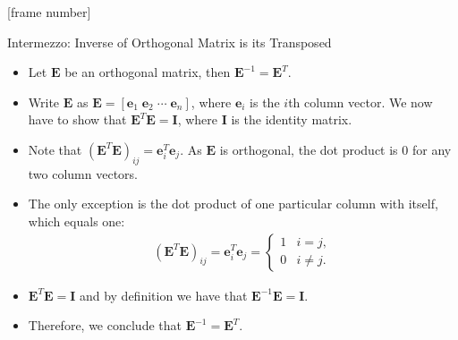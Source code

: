 \documentclass[aspectratio=169,t]{beamer}
\begin{document}
  {
    [frame number]
    \begin{frame}{Intermezzo: Inverse of Orthogonal Matrix is its Transposed}
    \begin{itemize}
      \item Let $\mathbf{E}$ be an orthogonal matrix, then $\mathbf{E}^{-1} = \mathbf{E}^T$.
      \item Write $\mathbf{E}$ as $\mathbf{E} = [\mathbf{e}_1 \; \mathbf{e}_2 \; \cdots \; \mathbf{e}_n]$, where $\mathbf{e}_i$ is the $i$th column vector. We now have to show that $\mathbf{E}^T\mathbf{E} = \mathbf{I}$, where $\mathbf{I}$ is the identity matrix.
      \item Note that $(\mathbf{E}^T\mathbf{E})_{ij} = \mathbf{e}_i^T\mathbf{e}_j$. As $\mathbf{E}$ is orthogonal, the dot product is $0$ for any two column vectors. \item The only exception is the dot product of one particular column with itself, \\
      which equals one:
      \begin{align}
        (\mathbf{E}^T\mathbf{E})_{ij} = \mathbf{e}_i^T\mathbf{e}_j =
        \begin{cases}
          1 & i=j, \\
          0 & i \neq j.
        \end{cases}
      \end{align}
      \item $\mathbf{E}^T\mathbf{E} = \mathbf{I}$ and by definition we have that $\mathbf{E}^{-1}\mathbf{E} = \mathbf{I}$.
      \item Therefore, we conclude that $\mathbf{E}^{-1} = \mathbf{E}^T$.
    \end{itemize}
    \end{frame}
  }
\end{document}
